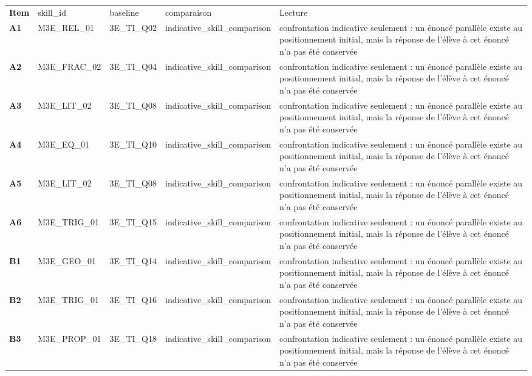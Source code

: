 \documentclass[10pt,a4paper]{article}
\begin{document}
\par\noindent\begin{tabularx}{\linewidth}{>{\bfseries}p{9mm} >{\ttfamily\scriptsize}p{25mm} >{\ttfamily\scriptsize}p{22mm} >{\ttfamily\scriptsize}p{16mm} X}
\rowcolor{Navy}\color{white}Item & \color{white}\scriptsize skill\_id & \color{white}\scriptsize baseline & \color{white}\scriptsize comparaison & \color{white}Lecture \\
A1 & M3E\_REL\_01 & 3E\_TI\_Q02 & indicative\_skill\_comparison & confrontation indicative seulement : un énoncé parallèle existe au positionnement initial, mais la réponse de l'élève à cet énoncé n'a pas été conservée \\
A2 & M3E\_FRAC\_02 & 3E\_TI\_Q04 & indicative\_skill\_comparison & confrontation indicative seulement : un énoncé parallèle existe au positionnement initial, mais la réponse de l'élève à cet énoncé n'a pas été conservée \\
A3 & M3E\_LIT\_02 & 3E\_TI\_Q08 & indicative\_skill\_comparison & confrontation indicative seulement : un énoncé parallèle existe au positionnement initial, mais la réponse de l'élève à cet énoncé n'a pas été conservée \\
A4 & M3E\_EQ\_01 & 3E\_TI\_Q10 & indicative\_skill\_comparison & confrontation indicative seulement : un énoncé parallèle existe au positionnement initial, mais la réponse de l'élève à cet énoncé n'a pas été conservée \\
A5 & M3E\_LIT\_02 & 3E\_TI\_Q08 & indicative\_skill\_comparison & confrontation indicative seulement : un énoncé parallèle existe au positionnement initial, mais la réponse de l'élève à cet énoncé n'a pas été conservée \\
A6 & M3E\_TRIG\_01 & 3E\_TI\_Q15 & indicative\_skill\_comparison & confrontation indicative seulement : un énoncé parallèle existe au positionnement initial, mais la réponse de l'élève à cet énoncé n'a pas été conservée \\
B1 & M3E\_GEO\_01 & 3E\_TI\_Q14 & indicative\_skill\_comparison & confrontation indicative seulement : un énoncé parallèle existe au positionnement initial, mais la réponse de l'élève à cet énoncé n'a pas été conservée \\
B2 & M3E\_TRIG\_01 & 3E\_TI\_Q16 & indicative\_skill\_comparison & confrontation indicative seulement : un énoncé parallèle existe au positionnement initial, mais la réponse de l'élève à cet énoncé n'a pas été conservée \\
B3 & M3E\_PROP\_01 & 3E\_TI\_Q18 & indicative\_skill\_comparison & confrontation indicative seulement : un énoncé parallèle existe au positionnement initial, mais la réponse de l'élève à cet énoncé n'a pas été conservée \\

\end{tabularx}
\end{document}
